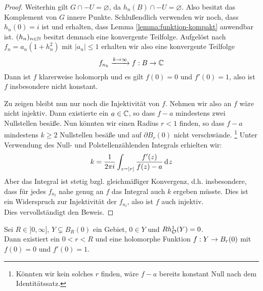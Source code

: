 \begin{proof}
  Weiterhin gilt $G \cap -U = \varnothing$, da $h_n(B) \cap -U =
  \varnothing$. Also besitzt das Komplement von $G$ innere Punkte.
  Schlußendlich verwenden wir noch, dass $h_n(0) = i$ ist und
  erhalten, dass Lemma \ref{lemma:funktion-kompakt} anwendbar ist.
  $(h_n)_{n \in \mathbb{N}}$ besitzt demnach
  eine konvergente Teilfolge. Aufgelöst nach $f_n =
  a_n(1 + h_n^2)$ mit $|a_n| \leq 1$ erhalten wir also eine
  konvergente Teilfolge
  \[
  f_{n_k} \xrightarrow{k \rightarrow \infty} f: B \rightarrow \mathbb{C}
  \]
  Dann ist $f$ klarerweise holomorph und es gilt $f(0) = 0$ und $f'(0)
  = 1$, also ist $f$ insbesondere nicht konstant.

  Zu zeigen bleibt nun nur noch die Injektivität von $f$.
  Nehmen wir also an $f$ wäre nicht injektiv. Dann existierte ein $a \in \mathbb{C}$,
  so dass $f-a$ mindestens zwei Nullstellen besäße. Nun könnten wir
  einen Radius $r < 1$ finden, so dass $f-a$ mindestens $k\geq 2$
  Nullstellen besäße und auf $\partial B_r(0)$ nicht
  verschwände. \footnote{Könnten wir kein solches $r$ finden, wäre $f-a$
  bereits konstant Null nach dem Identitätssatz.} Unter Verwendung des
  Null- und Polstellenzählenden Integrals erhielten wir:
  \[
  k = \frac1{2\pi i} \int_{z = |r|} \frac{f'(z)}{f(z) - a} \d[z]
  \]
  Aber das Integral ist stetig bzgl. gleichmäßiger Konvergenz,
  d.h. insbesondere, dass für jedes $f_{n_l}$ nahe genug an $f$ das
  Integral auch $k$ ergeben müsste. Dies ist ein Widerspruch zur
  Injektivität der $f_{n_l}$, also ist $f$ auch injektiv. \\
  Dies vervollständigt den Beweis.
\end{proof}

\begin{lemma}
  \label{lemma:bihol-kreis}
  Sei $R \in ]0, \infty]$, $Y \subsetneq B_R(0)$ ein Gebiet, $0 \in Y$
  und $Rh_{\mathcal{O}}^1(Y) = 0$. \\
  Dann existiert ein $0< r <R$ und eine holomorphe Funktion $f: Y \rightarrow B_r(0)$ mit $f(0) =
  0$ und $f'(0) = 1$.
\end{lemma}

